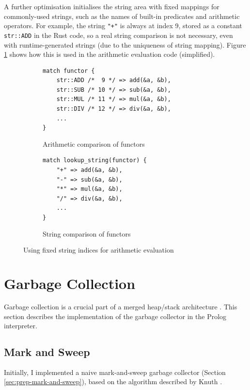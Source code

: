 A further optimisation initialises the string area with fixed mappings for commonly-used strings, such as the names of built-in predicates and arithmetic operators. For example, the string \texttt{"+"} is always at index 9, stored as a constant \texttt{str::ADD} in the Rust code, so a real string comparison is not necessary, even with runtime-generated strings (due to the uniqueness of string mapping). Figure \ref{fig:fixed-string-indices} shows how this is used in the arithmetic evaluation code (simplified).

\begin{figure}[H]
\centering
\begin{subfigure}{.5\textwidth}
\centering
\begin{verbatim}
match functor {
    str::ADD /*  9 */ => add(&a, &b),
    str::SUB /* 10 */ => sub(&a, &b),
    str::MUL /* 11 */ => mul(&a, &b),
    str::DIV /* 12 */ => div(&a, &b),
    ...
}
\end{verbatim}
\caption{Arithmetic comparison of functors}
\end{subfigure}%
\begin{subfigure}{.5\textwidth}
\centering
\begin{verbatim}
match lookup_string(functor) {
    "+" => add(&a, &b),
    "-" => sub(&a, &b),
    "*" => mul(&a, &b),
    "/" => div(&a, &b),
    ...
}
\end{verbatim}
\caption{String comparison of functors}
\end{subfigure}
\caption{Using fixed string indices for arithmetic evaluation}
\label{fig:fixed-string-indices}
\end{figure}

\section{Garbage Collection}

\label{sec:gc-impl}

Garbage collection is a crucial part of a merged heap/stack architecture \cite{liEfficientMemoryManagement2000}. This section describes the implementation of the garbage collector in the Prolog interpreter.

\subsection{Mark and Sweep}

Initially, I implemented a naive mark-and-sweep garbage collector (Section \ref{sec:prep-mark-and-sweep}), based on the algorithm described by Knuth \cite{knuthArtComputerProgramming1997}.

